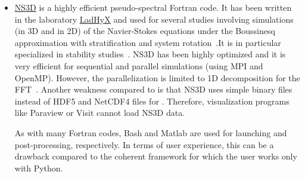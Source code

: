 \begin{itemize}
Therefore, SpectralDNS is technically very similar to .
%
Some differences are that SpectralDNS has no object oriented API, and that the user
has to define output and forcing in the launching script\footnote{See
\href{https://github.com/spectralDNS/spectralDNS/tree/master/demo}{the demo
scripts of SpectralDNS}.}, which are thus usually much longer than for
.
%
Moreover, the parallel Fourier transforms are done using the Python package
\href{https://github.com/spectralDNS/mpiFFT4py}{}, which is only
able to use the FFTW library and not other libraries as with 
\citep[][]{fluidfft}.

\item \href{https://bitbucket.org/paugier/ns3d}{NS3D} is a highly efficient
pseudo-spectral Fortran code.
%
It has been written in the laboratory
\href{https://www.ladhyx.polytechnique.fr}{LadHyX} and used for several studies
involving simulations (in 3D and in 2D) of the Navier-Stokes equations under the
Boussinesq approximation with stratification and system
rotation~\cite[][]{DeloncleBillantChomaz2008}.It is in particular specialized in
stability studies~\cite[][]{BillantDeloncleChomazOtheguy2010}.
%
NS3D has been highly optimized and it is very efficient for sequential and
parallel simulations (using MPI and OpenMP).  However, the parallelization is
limited to 1D decomposition for the FFT~\cite[][]{fluidfft}.
%
Another weakness compared to  is that NS3D uses simple binary files
instead of HDF5 and NetCDF4 files for .  Therefore, visualization
programs like Paraview or Visit cannot load NS3D data.

As with many Fortran codes, Bash and Matlab are used for launching and
post-processing, respectively.
%
In terms of user experience, this can be a drawback compared to the coherent
framework  for which the user works only with Python.


\end{itemize}

